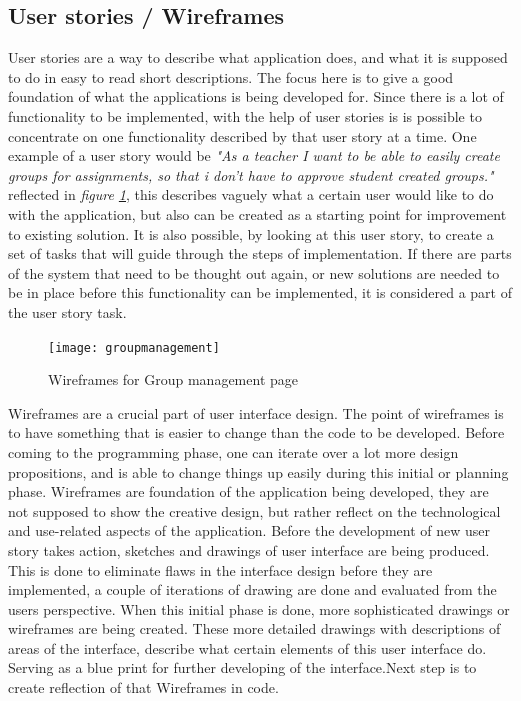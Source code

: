 \subsection{User stories / Wireframes}
User stories are a way to describe what application does, and what it is supposed to do in easy to read short descriptions. The focus here is to give a good foundation of what the applications is being developed for. Since there is a lot of functionality to be implemented, with the help of user stories is is possible to concentrate on one functionality described by that user story at a time. One example of a user story would be \emph{"As a teacher I want to be able to easily create groups for assignments, so that i don't have to approve student created groups."} reflected in \emph{figure \ref{fig:groupmanagement}}, this describes vaguely what a certain user would like to do with the application, but also can be created as a starting point for improvement to existing solution. It is also possible, by looking at this user story, to create a set of tasks that will guide through the steps of implementation. If there are parts of the system that need to be thought out again, or new solutions are needed to be in place before this functionality can be implemented, it is considered a part of the user story task.
\begin{figure}[h]
  \centering
  \texttt{[image: groupmanagement]}
  \caption{Wireframes for Group management page }
  \label{fig:groupmanagement}
\end{figure}
Wireframes are a crucial part of user interface design. The point of wireframes is to have something that is easier to change than the code to be developed. Before coming to the programming phase, one can iterate over a lot more design propositions, and is able to change things up easily during this initial or planning phase. Wireframes are foundation of the application being developed, they are not supposed to show the creative design, but rather reflect on the technological and use-related aspects of the application. Before the development of new user story takes action, sketches and drawings of user interface are being produced. This is done to eliminate flaws in the interface design before they are implemented, a couple of iterations of drawing are done and evaluated from the users perspective. When this initial phase is done, more sophisticated drawings or wireframes are being created. These more detailed drawings with descriptions of areas of the interface, describe what certain elements of this user interface do. Serving as a blue print for further developing of the interface.Next step is to create reflection of that Wireframes in code.

